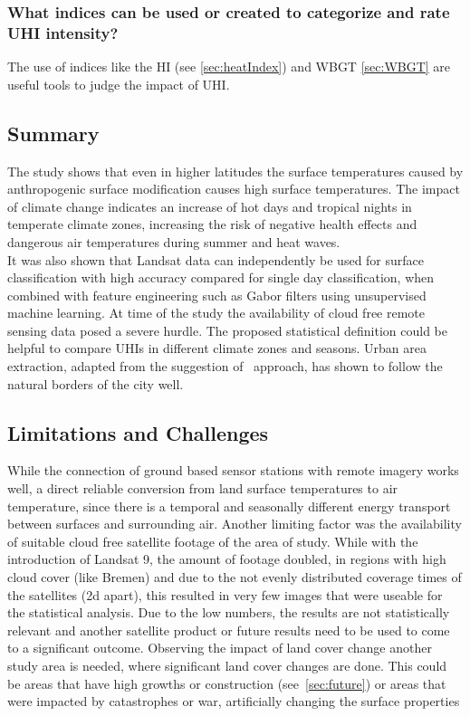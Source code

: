 \documentclass[12pt,a4paper, english,twoside]{scrartcl}
\begin{document}
  
 \subsubsection{What indices can be used or created to categorize and rate \gls{UHI} intensity?}\label{a5}
  The use of indices like the \gls{HI} (see \cref{sec:heatIndex}) and \gls{WBGT} \cref{sec:WBGT} are useful tools to judge the impact of \gls{UHI}.

\subsection{Summary}
    The study shows that even in higher latitudes the surface temperatures caused by anthropogenic surface modification causes high surface temperatures. 
    The impact of climate change indicates an increase of hot days and tropical nights in temperate climate zones, increasing the risk of negative health effects and dangerous air temperatures during summer and heat waves.\\%
    It was also shown that Landsat data can independently be used for surface classification with high accuracy compared for single day classification, when combined with feature engineering such as Gabor filters using unsupervised machine learning.
    At time of the study the availability of cloud free remote sensing data posed a severe hurdle. 
    The proposed statistical definition could be helpful to compare \glspl{UHI} in different climate zones and seasons. 
    Urban area extraction, adapted from the suggestion of~\cite{Sobrino2020} approach, has shown to follow the natural borders of the city well.

\subsection{Limitations and Challenges}
  While the connection of ground based sensor stations with remote imagery works well, a direct reliable conversion from land surface temperatures to air temperature, since there is a temporal and seasonally different energy transport between surfaces and surrounding air. 
  Another limiting factor was the availability of suitable cloud free satellite footage of the area of study.
  While with the introduction of Landsat 9, the amount of footage doubled, in regions with high cloud cover (like Bremen) and due to the not evenly distributed coverage times of the satellites (2d apart), this resulted in very few images that were useable for the statistical analysis. 
  Due to the low numbers, the results are not statistically relevant and another satellite product or future results need to be used to come to a significant outcome. 
  Observing the impact of land cover change another study area is needed, where significant land cover changes are done. 
  This could be areas that have high growths or construction (see~\cref{sec:future}) or areas that were impacted by catastrophes or war, artificially changing the surface properties 
\end{document}
